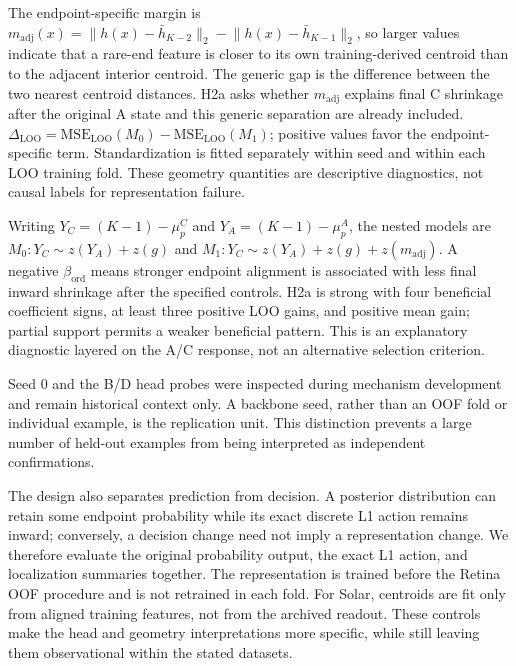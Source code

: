 The endpoint-specific margin is \(m_{\mathrm{adj}}(x)=\lVert h(x)-\bar h_{K-2}\rVert_2-\lVert h(x)-\bar h_{K-1}\rVert_2\), so larger values indicate that a rare-end feature is closer to its own training-derived centroid than to the adjacent interior centroid. The generic gap is the difference between the two nearest centroid distances. H2a asks whether \(m_{\mathrm{adj}}\) explains final C shrinkage after the original A state and this generic separation are already included. \(\Delta_{\mathrm{LOO}}=\mathrm{MSE}_{\mathrm{LOO}}(M_0)-\mathrm{MSE}_{\mathrm{LOO}}(M_1)\); positive values favor the endpoint-specific term. Standardization is fitted separately within seed and within each LOO training fold. These geometry quantities are descriptive diagnostics, not causal labels for representation failure.

Writing \(Y_C=(K-1)-\mu_p^C\) and \(Y_A=(K-1)-\mu_p^A\), the nested models are \(M_0:Y_C\sim z(Y_A)+z(g)\) and \(M_1:Y_C\sim z(Y_A)+z(g)+z(m_{\mathrm{adj}})\). A negative \(\beta_{\mathrm{ord}}\) means stronger endpoint alignment is associated with less final inward shrinkage after the specified controls. H2a is strong with four beneficial coefficient signs, at least three positive LOO gains, and positive mean gain; partial support permits a weaker beneficial pattern. This is an explanatory diagnostic layered on the A/C response, not an alternative selection criterion.

Seed 0 and the B/D head probes were inspected during mechanism development and remain historical context only. A backbone seed, rather than an OOF fold or individual example, is the replication unit. This distinction prevents a large number of held-out examples from being interpreted as independent confirmations.

The design also separates prediction from decision. A posterior distribution can retain some endpoint probability while its exact discrete L1 action remains inward; conversely, a decision change need not imply a representation change. We therefore evaluate the original probability output, the exact L1 action, and localization summaries together. The representation is trained before the Retina OOF procedure and is not retrained in each fold. For Solar, centroids are fit only from aligned training features, not from the archived readout. These controls make the head and geometry interpretations more specific, while still leaving them observational within the stated datasets.

